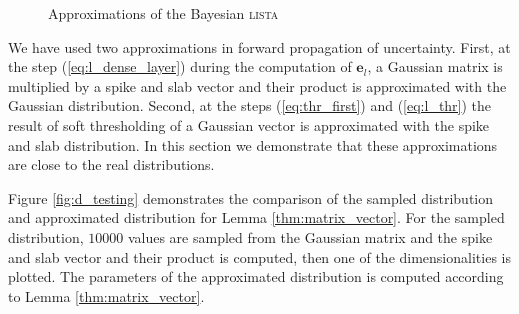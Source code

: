 \documentclass{article}
\begin{document}
\begin{figure}[!t]
\caption{Approximations of the Bayesian \textsc{lista}}
\end{figure}

We have used two approximations in forward propagation of uncertainty. First, at the step (\ref{eq:l_dense_layer}) during the computation of $\mathbf{e}_l$, a Gaussian matrix is multiplied by a spike and slab vector and their product is approximated with the Gaussian distribution. Second, at the steps (\ref{eq:thr_first}) and (\ref{eq:l_thr}) the result of soft thresholding of a Gaussian vector is approximated with the spike and slab distribution. In this section we demonstrate that these approximations are close to the real distributions.

Figure \ref{fig:d_testing} demonstrates the comparison of the sampled distribution and approximated distribution for Lemma \ref{thm:matrix_vector}. For the sampled distribution, $10000$ values are sampled from the Gaussian matrix and the spike and slab vector and their product is computed, then one of the dimensionalities is plotted. The parameters of the approximated distribution is computed according to Lemma \ref{thm:matrix_vector}.
\end{document}
